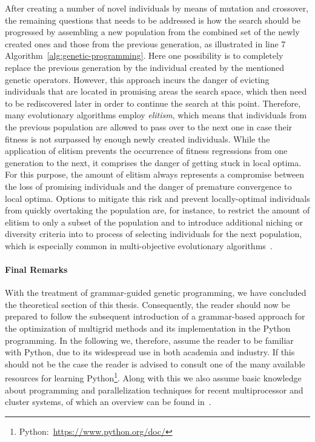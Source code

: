 After creating a number of novel individuals by means of mutation and crossover, the remaining questions that needs to be addressed is how the search should be progressed by assembling a new population from the combined set of the newly created ones and those from the previous generation, as illustrated in line 7 Algorithm~\ref{alg:genetic-programming}.
Here one possibility is to completely replace the previous generation by the individual created by the mentioned genetic operators.
However, this approach incurs the danger of evicting individuals that are located in promising areas the search space, which then need to be rediscovered later in order to continue the search at this point.
Therefore, many evolutionary algorithms employ \emph{elitism}, which means that individuals from the previous population are allowed to pass over to the next one in case their fitness is not surpassed by enough newly created individuals.
While the application of elitism prevents the occurrence of fitness regressions from one generation to the next, it comprises the danger of getting stuck in local optima.
For this purpose, the amount of elitism always represents a compromise between the loss of promising individuals and the danger of premature convergence to local optima.
Options to mitigate this risk and prevent locally-optimal individuals from quickly overtaking the population are, for instance, to restrict the amount of elitism to only a subset of the population and to introduce additional niching or diversity criteria into to process of selecting individuals for the next population, which is especially common in multi-objective evolutionary algorithms~\cite{coello2007evolutionary}.

\paragraph{Final Remarks}
With the treatment of grammar-guided genetic programming, we have concluded the theoretical section of this thesis.
Consequently, the reader should now be prepared to follow the subsequent introduction of a grammar-based approach for the optimization of multigrid methods and its implementation in the Python programming.
In the following we, therefore, assume the reader to be familiar with Python, due to its widespread use in both academia and industry.
If this should not be the case the reader is advised to consult one of the many available resources for learning Python\footnote{Python:~\url{https://www.python.org/doc/}}.
Along with this we also assume basic knowledge about programming and parallelization techniques for recent multiprocessor and cluster systems, of which an overview can be found in~\cite{hager2010introduction}.

